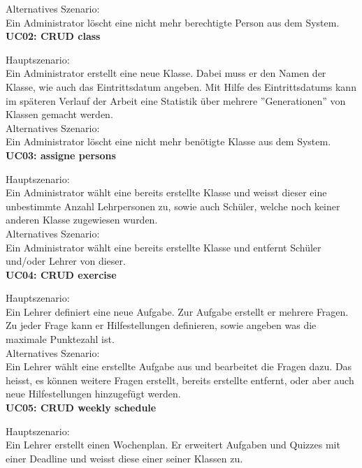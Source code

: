 \noindent Alternatives Szenario: \\
Ein Administrator löscht eine nicht mehr berechtigte Person aus dem System. \\


\noindent \textbf{UC02: CRUD class}

\noindent Hauptszenario: \\
Ein Administrator erstellt eine neue Klasse. Dabei muss er den Namen der Klasse, wie auch das Eintrittsdatum angeben. Mit Hilfe des Eintrittsdatums kann im späteren Verlauf der Arbeit eine Statistik über mehrere ''Generationen'' von Klassen gemacht werden. \\

\noindent Alternatives Szenario: \\
Ein Administrator löscht eine nicht mehr benötigte Klasse aus dem System. \\


\noindent \textbf{UC03: assigne persons}

\noindent Hauptszenario: \\
Ein Administrator wählt eine bereits erstellte Klasse und weisst dieser eine unbestimmte Anzahl Lehrpersonen zu, sowie auch Schüler, welche noch keiner anderen Klasse zugewiesen wurden. \\

\noindent Alternatives Szenario: \\
Ein Administrator wählt eine bereits erstellte Klasse und entfernt Schüler und/oder Lehrer von dieser. \\


\noindent \textbf{UC04: CRUD exercise}

\noindent Hauptszenario: \\
Ein Lehrer definiert eine neue Aufgabe. Zur Aufgabe erstellt er mehrere Fragen. Zu jeder Frage kann er Hilfestellungen definieren, sowie angeben was die maximale Punktezahl ist. \\

\noindent Alternatives Szenario: \\
Ein Lehrer wählt eine erstellte Aufgabe aus und bearbeitet die Fragen dazu. Das heisst, es können weitere Fragen erstellt, bereits erstellte entfernt, oder aber auch neue Hilfestellungen hinzugefügt werden. \\


\noindent \textbf{UC05: CRUD weekly schedule}

\noindent Hauptszenario: \\
Ein Lehrer erstellt einen Wochenplan. Er erweitert Aufgaben und Quizzes mit einer Deadline und weisst diese einer seiner Klassen zu. \\

